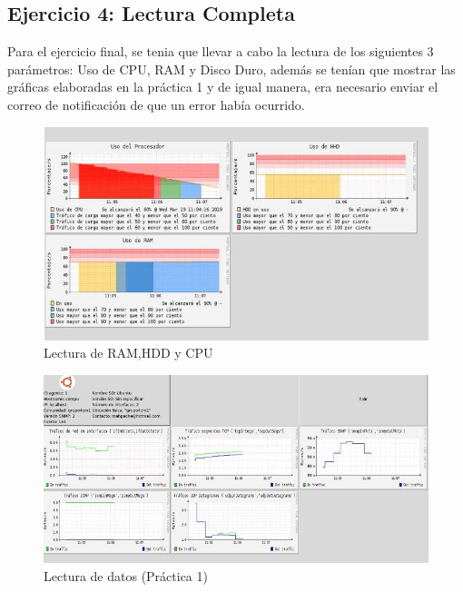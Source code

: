 \subsection{Ejercicio 4: Lectura Completa}
\noindent
Para el ejercicio final, se tenia que llevar a cabo la lectura de los siguientes 3 parámetros: Uso de CPU, RAM y Disco Duro, además se tenían que mostrar las gráficas elaboradas en la práctica 1 y de igual manera, era necesario enviar el correo de notificación de que un error había ocurrido.
\begin{figure}[H]
  \centering
    \includegraphics[scale=1]{imagenes/primero/6.JPG}
    \caption{Lectura de RAM,HDD y CPU}
\end{figure}
\begin{figure}[H]
  \centering
    \includegraphics[scale=1]{imagenes/primero/7.JPG}
    \caption{Lectura de datos (Práctica 1)}
\end{figure}